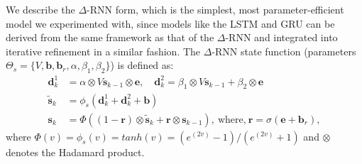 \documentclass[smallabstract,smallcaptions]{dccpaper}
\begin{document}
We describe the $\Delta$-RNN form, which is the simplest, most parameter-efficient model we experimented with, since models like the LSTM and GRU can be derived from the same framework as that of the $\Delta$-RNN \cite{ororbia2017diff} and integrated into iterative refinement in a similar fashion. The $\Delta$-RNN state function (parameters $\Theta_s = \{V, \mathbf{b}, \mathbf{b}_r, \alpha, \beta_1, \beta_2 \}$) is defined as:
\begin{align}
\mathbf{d}^1_k &= \alpha \otimes V \mathbf{s}_{k-1} \otimes \mathbf{e}, \quad
\mathbf{d}^2_k = \beta_1 \otimes V \mathbf{s}_{k-1} + \beta_2 \otimes \mathbf{e} \\
\widetilde{\mathbf{s}}_k &= \phi_s(\mathbf{d}^1_k + \mathbf{d}^2_k + \mathbf{b}) \\
\mathbf{s}_k &=  \Phi( (1 - \mathbf{r}) \otimes \widetilde{\mathbf{s}}_k + \mathbf{r} \otimes \mathbf{s}_{k-1} ), \ \mbox{where,} \ \mathbf{r} =  \sigma(\mathbf{e} + \mathbf{b}_r) \label{general_second_order},
\end{align}
where $\Phi(v) = \phi_s(v) = tanh(v) = (e^{(2v)} - 1) / (e^{(2v)} + 1)$ and $\otimes$ denotes the Hadamard product.

\end{document}
